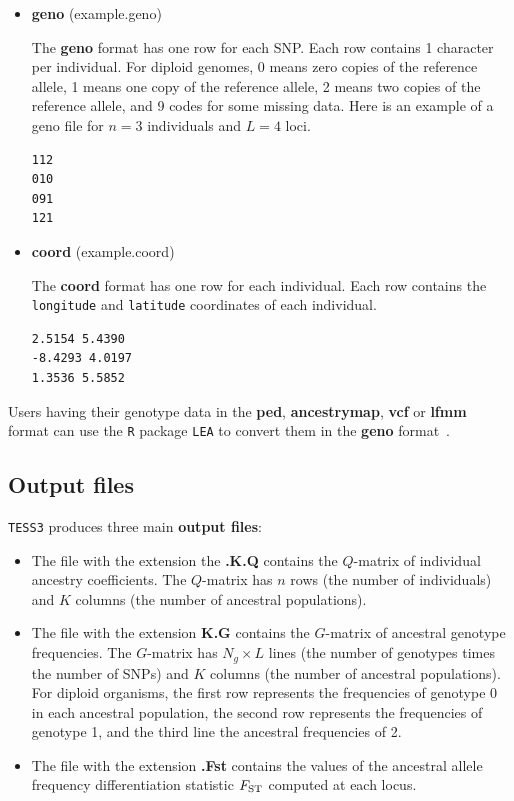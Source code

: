 \documentclass[10pt,a4paper]{article}
\begin{document}
\begin{itemize}
\item {\bf geno} (example.geno)

The {\bf geno} format has one row for each SNP. Each row contains 1 character 
per individual. For diploid genomes,  0 means zero copies of the reference 
allele, 1 means one copy of the reference allele, 2 means two copies of the 
reference allele, and 9 codes for some missing data. Here is an example of a 
geno file for $n=3$ individuals and $L=4$ loci.
\\
\begin{center}
\footnotesize
\begin{Verbatim}[frame=single]
112
010
091
121
\end{Verbatim}
\end{center}


\item {\bf coord} (example.coord)

The {\bf coord} format has one row for each individual. Each row contains the 
\verb|longitude| and \verb|latitude| coordinates of each individual.
\\
\begin{center}
\footnotesize
\begin{Verbatim}[frame=single]
2.5154 5.4390
-8.4293 4.0197
1.3536 5.5852
\end{Verbatim}
\end{center}

\end{itemize}

\noindent Users having their genotype data in the {\bf ped}, {\bf ancestrymap}, 
{\bf vcf} or {\bf lfmm} format  can use the {\tt R} package {\tt LEA} to convert 
them in the {\bf geno} format~\cite{frichot2015lea}. 

\subsection{Output files}

{\tt TESS3} produces three main {\bf output files}:

\begin{itemize}
\item The file with the extension the {\bf .K.Q} contains the $Q$-matrix of 
individual ancestry coefficients.
The $Q$-matrix has $n$ rows (the number of individuals) and $K$ columns (the 
number of ancestral populations).
\item The file with the extension {\bf K.G} contains the $G$-matrix of ancestral 
genotype frequencies.
The $G$-matrix has $N_g\times L$ lines (the number of genotypes times the number 
of SNPs) and $K$ columns (the number of ancestral populations). For diploid 
organisms, the first row represents the frequencies of genotype 0 in each 
ancestral population, the second row represents the frequencies of genotype 1, 
and the third line the ancestral frequencies of 2.
\item The file with the extension {\bf .Fst} contains the values of the 
ancestral allele frequency differentiation statistic $F_{\rm ST}$ computed at 
each locus.  
\end{itemize}
\end{document}
